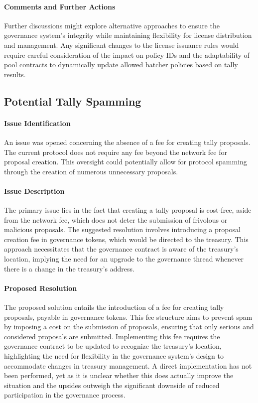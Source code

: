 \documentclass[11pt]{article}
\begin{document}
\paragraph{Comments and Further Actions}
Further discussions might explore alternative approaches to ensure the governance system's integrity while maintaining flexibility for license distribution and management. Any significant changes to the license issuance rules would require careful consideration of the impact on policy IDs and the adaptability of pool contracts to dynamically update allowed batcher policies based on tally results.


\subsection{Potential Tally Spamming}

\paragraph{Issue Identification}
An issue was opened concerning the absence of a fee for creating tally proposals.
The current protocol does not require any fee beyond the network fee for proposal creation.
This oversight could potentially allow for protocol spamming through the creation of numerous unnecessary proposals.

\paragraph{Issue Description}
The primary issue lies in the fact that creating a tally proposal is cost-free, aside from the network fee, which does not deter the submission of frivolous or malicious proposals.
The suggested resolution involves introducing a proposal creation fee in governance tokens, which would be directed to the treasury.
This approach necessitates that the governance contract is aware of the treasury's location, implying the need for an upgrade to the governance thread whenever there is a change in the treasury's address.

\paragraph{Proposed Resolution}
The proposed solution entails the introduction of a fee for creating tally proposals, payable in governance tokens.
This fee structure aims to prevent spam by imposing a cost on the submission of proposals, ensuring that only serious and considered proposals are submitted.
Implementing this fee requires the governance contract to be updated to recognize the treasury's location, highlighting the need for flexibility in the governance system's design to accommodate changes in treasury management.
A direct implementation has not been performed, yet as it is unclear whether this does actually improve the situation
and the upsides outweigh the significant downside of reduced participation in the governance process.
\end{document}
